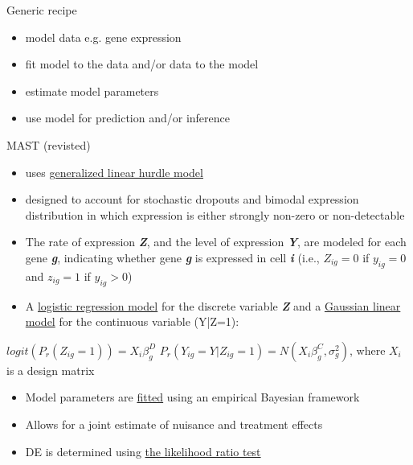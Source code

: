 \documentclass{beamer}\usepackage[]{graphicx}\usepackage[]{color}
\begin{document}
\begin{frame}
\begin{block}{Generic recipe}
\begin{itemize}
\item model data e.g. gene expression
\item fit model to the data and/or data to the model
\item estimate model parameters
\item use model for prediction and/or inference
\end{itemize}
\end{block}
\end{frame}

\begin{frame}
\begin{block}{MAST (revisted)}
\vspace{0.5cm}
\scriptsize
\begin{itemize}
  \item uses \underline{generalized linear hurdle model}
  \item designed to account for stochastic dropouts and bimodal expression distribution in which expression is either strongly non-zero or non-detectable
  \item The rate of expression \textbf{\textit{Z}}, and the level of expression \textbf{\textit{Y}}, are modeled for each gene \textbf{\textit{g}}, indicating whether gene \textbf{\textit{g}} is expressed in cell \textbf{\textit{i}} (i.e., $Z_{ig}=0$ if $y_{ig}=0$ and $z_{ig}=1$ if $y_{ig}>0$)
  \item A \underline{logistic regression model} for the discrete variable \textbf{\textit{Z}} and a \underline{Gaussian linear model} for the continuous variable (Y|Z=1):
   \end{itemize}
   \begin{center}
    $logit (P_r(Z_{ig}=1))=X_i\beta_g^D$ \newline
    $P_r(Y_{ig}=Y|Z_{ig}=1)=N(X_i\beta_g^C,\sigma_g^2)$, where $X_i$ is a design matrix
\end{center}
\begin{itemize}
\item Model parameters are \underline{fitted} using an empirical Bayesian framework
\item Allows for a joint estimate of nuisance and treatment effects
\item DE is determined using \underline{the likelihood ratio test}
\end{itemize}
\end{block}
\end{frame}
\end{document}
